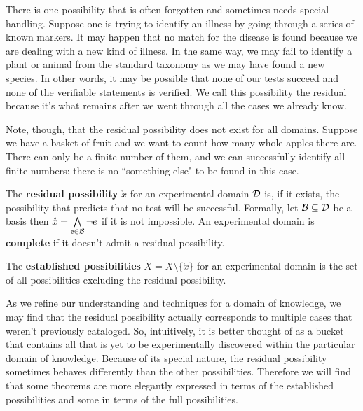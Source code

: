 \documentclass[11pt,letterpaper,fleqn]{memoir} %
\begin{document}
There is one possibility that is often forgotten and sometimes needs special handling. Suppose one is trying to identify an illness by going through a series of known markers. It may happen that no match for the disease is found because we are dealing with a new kind of illness. In the same way, we may fail to identify a plant or animal from the standard taxonomy as we may have found a new species. In other words, it may be possible that none of our tests succeed and none of the verifiable statements is verified. We call this possibility the residual because it's what remains after we went through all the cases we already know.

Note, though, that the residual possibility does not exist for all domains. Suppose we have a basket of fruit and we want to count how many whole apples there are. There can only be a finite number of them, and we can successfully identify all finite numbers: there is no ``something else" to be found in this case.

\begin{mathSection}
	\begin{defn}
		The \textbf{residual possibility} $\mathring{x}$ for an experimental domain $\edomain$ is, if it exists, the possibility that predicts that no test will be successful. Formally, let $\basis \subseteq \edomain$ be a basis then  $\mathring{x} = \bigAND\limits_{\stmt[e] \in \basis} \NOT e$ if it is not impossible. An experimental domain is \textbf{complete} if it doesn't admit a residual possibility.
	\end{defn}

	\begin{defn}
	The \textbf{established possibilities} $\dot{X}=X\setminus\{\mathring{x}\}$ for an experimental domain is the set of all possibilities excluding the residual possibility.
\end{defn}
\end{mathSection}

As we refine our understanding and techniques for a domain of knowledge, we may find that the residual possibility actually corresponds to multiple cases that weren't previously cataloged. So, intuitively, it is better thought of as a bucket that contains all that is yet to be experimentally discovered within the particular domain of knowledge. Because of its special nature, the residual possibility sometimes behaves differently than the other possibilities. Therefore we will find that some theorems are more elegantly expressed in terms of the established possibilities and some in terms of the full possibilities.
\end{document}
